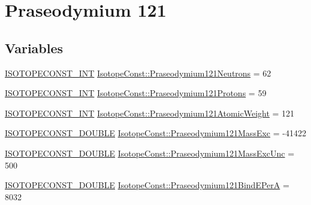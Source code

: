 \hypertarget{group___isotope_const-_praseodymium-_pr121}{}\section{Praseodymium 121}
\label{group___isotope_const-_praseodymium-_pr121}
\subsection*{Variables}
\begin{DoxyCompactItemize}
\item 
\mbox{\hyperlink{group___isotope_const-_macros_ga5f18360b3e99483a35c32d789e62621c}{I\+S\+O\+T\+O\+P\+E\+C\+O\+N\+S\+T\+\_\+\+I\+NT}} \mbox{\hyperlink{group___isotope_const-_praseodymium-_pr121_gaa5fc8269f0a44c3634d6647206e286cc}{Isotope\+Const\+::\+Praseodymium121\+Neutrons}} = 62
\item 
\mbox{\hyperlink{group___isotope_const-_macros_ga5f18360b3e99483a35c32d789e62621c}{I\+S\+O\+T\+O\+P\+E\+C\+O\+N\+S\+T\+\_\+\+I\+NT}} \mbox{\hyperlink{group___isotope_const-_praseodymium-_pr121_ga9e69eae8da71e0cc10cd7c79dabdd51e}{Isotope\+Const\+::\+Praseodymium121\+Protons}} = 59
\item 
\mbox{\hyperlink{group___isotope_const-_macros_ga5f18360b3e99483a35c32d789e62621c}{I\+S\+O\+T\+O\+P\+E\+C\+O\+N\+S\+T\+\_\+\+I\+NT}} \mbox{\hyperlink{group___isotope_const-_praseodymium-_pr121_ga371ccf59a086c1298dbf2615e832c43b}{Isotope\+Const\+::\+Praseodymium121\+Atomic\+Weight}} = 121
\item 
\mbox{\hyperlink{group___isotope_const-_macros_ga8f45a7272ce02c0b4c65c44636ed719a}{I\+S\+O\+T\+O\+P\+E\+C\+O\+N\+S\+T\+\_\+\+D\+O\+U\+B\+LE}} \mbox{\hyperlink{group___isotope_const-_praseodymium-_pr121_ga3973c1b67c14036d4eb3b03ca3c6ff97}{Isotope\+Const\+::\+Praseodymium121\+Mass\+Exc}} = -\/41422
\item 
\mbox{\hyperlink{group___isotope_const-_macros_ga8f45a7272ce02c0b4c65c44636ed719a}{I\+S\+O\+T\+O\+P\+E\+C\+O\+N\+S\+T\+\_\+\+D\+O\+U\+B\+LE}} \mbox{\hyperlink{group___isotope_const-_praseodymium-_pr121_ga83f7cc4219b404b8e91d5c3b31bb5140}{Isotope\+Const\+::\+Praseodymium121\+Mass\+Exc\+Unc}} = 500
\item 
\mbox{\hyperlink{group___isotope_const-_macros_ga8f45a7272ce02c0b4c65c44636ed719a}{I\+S\+O\+T\+O\+P\+E\+C\+O\+N\+S\+T\+\_\+\+D\+O\+U\+B\+LE}} \mbox{\hyperlink{group___isotope_const-_praseodymium-_pr121_gade50a6da6167cc1e8698e513d5d57027}{Isotope\+Const\+::\+Praseodymium121\+Bind\+E\+PerA}} = 8032

\end{DoxyCompactItemize}
